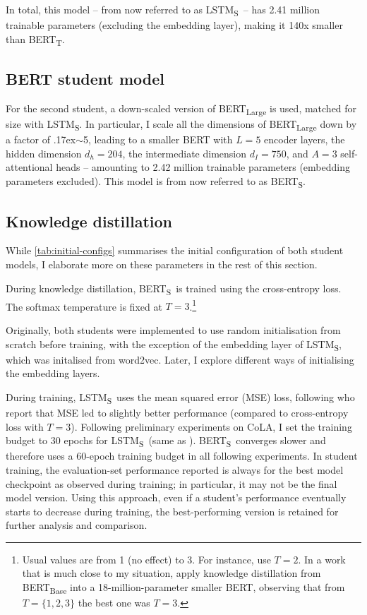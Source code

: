 \documentclass[bsc,frontabs,twoside,singlespacing,parskip,deptreport]{infthesis}
\def\mytilde{{\raise.17ex\hbox{$\scriptstyle\sim$}}}
\def\BERTT{BERT\textsubscript{T}}
\def\BERTS{BERT\textsubscript{S}}
\def\LSTMS{LSTM\textsubscript{S}}
\begin{document}
{{{      In total, this model -- from now referred to as \LSTMS~-- has 2.41 million trainable parameters (excluding the embedding layer), making it 140x smaller than \BERTT.
    }

    \subsection{BERT student model}{
      For the second student, a down-scaled version of BERT\textsubscript{Large} is used, matched for size with \LSTMS. In particular, I scale all the dimensions of BERT\textsubscript{Large} down by a factor of \mytilde5, leading to a smaller BERT with $L=5$ encoder layers, the hidden dimension $d_h=204$, the intermediate dimension $d_I=750$, and $A=3$ self-attentional heads -- amounting to 2.42 million trainable parameters (embedding parameters excluded). This model is from now referred to as \BERTS.
    }

    \subsection{Knowledge distillation}{
      While \autoref{tab:initial-configs} summarises the initial configuration of both student models, I elaborate more on these parameters in the rest of this section.

      During knowledge distillation, \BERTS~is trained using the cross-entropy loss. The softmax temperature is fixed at $T=3$.\footnote{Usual values are from 1 (no effect) to 3. For instance, \citet{Sanh_2019} use $T=2$. In a work that is much close to my situation, \citet{Tsai_2019} apply knowledge distillation from BERT\textsubscript{Base} into a 18-million-parameter smaller BERT, observing that from $T=\{1, 2, 3\}$ the best one was $T=3$.}
      
      Originally, both students were implemented to use random initialisation from scratch before training, with the exception of the embedding layer of \LSTMS, which was initalised from word2vec. Later, I explore different ways of initialising the embedding layers.
      
      During training, \LSTMS~uses the mean squared error (MSE) loss, following \citeauthor{Tang_2019b} who report that MSE led to slightly better performance (compared to cross-entropy loss with $T=3$). Following preliminary experiments on CoLA, I set the training budget to 30 epochs for \LSTMS~(same as \citeauthor{Tang_2019b}). \BERTS~converges slower and therefore uses a 60-epoch training budget in all following experiments. In student training, the evaluation-set performance reported is always for the best model checkpoint as observed during training; in particular, it may not be the final model version.
      Using this approach, even if a student's performance eventually starts to decrease during training, the best-performing version is retained for further analysis and comparison.

}}}
\end{document}
